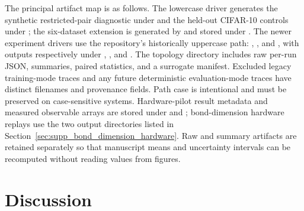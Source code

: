 \documentclass[11pt]{article}
\begin{document}
\begin{sloppypar}
The principal artifact map is as follows. The lowercase driver  generates the synthetic restricted-pair diagnostic under  and the held-out CIFAR-10 controls under ; the six-dataset extension is generated by  and stored under . The newer experiment drivers use the repository's historically uppercase path: , , and , with outputs respectively under , , and . The topology directory includes raw per-run JSON, summaries, paired statistics, and a surrogate manifest. Excluded legacy training-mode traces and any future deterministic evaluation-mode traces have distinct filenames and provenance fields. Path case is intentional and must be preserved on case-sensitive systems. Hardware-pilot result metadata and measured observable arrays are stored under  and ; bond-dimension hardware replays use the two output directories listed in Section~\ref{sec:supp_bond_dimension_hardware}. Raw and summary artifacts are retained separately so that manuscript means and uncertainty intervals can be recomputed without reading values from figures.
\end{sloppypar}

\section{Discussion}
\end{document}
